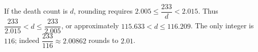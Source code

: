 If the death count is $d$, rounding requires $2.005\le\dfrac{233}{d}<2.015$. Thus $\dfrac{233}{2.015}<d\le\dfrac{233}{2.005}$, or approximately $115.633<d\le116.209$. The only integer is $\boxed{116}$; indeed $\dfrac{233}{116}\approx2.00862$ rounds to $2.01$.
